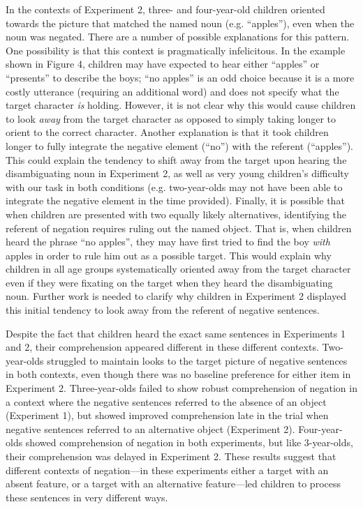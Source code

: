 \documentclass[man]{apa2}
\begin{document}
In the contexts of Experiment 2, three- and four-year-old children oriented towards the picture that matched the named noun (e.g. ``apples''), even when the noun was negated.  There are a number of possible explanations for this pattern.  One possibility is that this context is pragmatically infelicitous.  In the example shown in Figure 4, children may have expected to hear either ``apples'' or ``presents'' to describe the boys; ``no apples'' is an odd choice because it is a more costly utterance (requiring an additional word) and does not specify what the target character \emph{is} holding.  However, it is not clear why this would cause children to look \emph{away} from the target character as opposed to simply taking longer to orient to the correct character.  Another explanation is that it took children longer to fully integrate the negative element (``no'') with the referent (``apples'').  This could explain the tendency to shift away from the target upon hearing the disambiguating noun in Experiment 2, as well as very young children's difficulty with our task in both conditions (e.g. two-year-olds may not have been able to integrate the negative element in the time provided).  Finally, it is possible that when children are presented with two equally likely alternatives, identifying the referent of negation requires ruling out the named object.  That is, when children heard the phrase ``no apples'', they may have first tried to find the boy \emph{with} apples in order to rule him out as a possible target.  This would explain why children in all age groups systematically oriented away from the target character even if they were fixating on the target when they heard the disambiguating noun.  Further work is needed to clarify why children in Experiment 2 displayed this initial tendency to look away from the referent of negative sentences.  

Despite the fact that children heard the exact same sentences in Experiments 1 and 2, their comprehension appeared different in these different contexts.  Two-year-olds struggled to maintain looks to the target picture of negative sentences in both contexts, even though there was no baseline preference for either item in Experiment 2.  Three-year-olds failed to show robust comprehension of negation in a context where the negative sentences referred to the absence of an object (Experiment 1), but showed improved comprehension late in the trial when negative sentences referred to an alternative object (Experiment 2).  Four-year-olds showed comprehension of negation in both experiments, but like 3-year-olds, their comprehension was delayed in Experiment 2.  These results suggest that different contexts of negation---in these experiments either a target with an absent feature, or a target with an alternative feature---led children to process these sentences in very different ways.  
\end{document}
